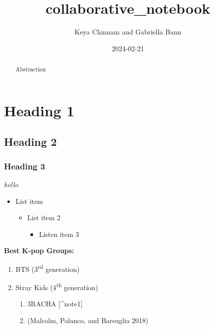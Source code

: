 \documentclass[
  letterpaper,
  DIV=11,
  numbers=noendperiod]{scrartcl}
\title{collaborative\_notebook}
\author{Keya Chinnam and Gabriella Bann}
\date{2024-02-21}
\providecommand{\tightlist}{%
  \setlength{\itemsep}{0pt}\setlength{\parskip}{0pt}}\usepackage{longtable,booktabs,array}
\begin{document}
\maketitle
\begin{abstract}
Abstraction
\end{abstract}


\section{Heading 1}\label{heading-1}

\subsection{Heading 2}\label{heading-2}

\subsubsection{Heading 3}\label{heading-3}

\emph{hello}

\begin{itemize}
\item
  List item

  \begin{itemize}
  \item
    List item 2

    \begin{itemize}
    \tightlist
    \item
      Listen item 3
    \end{itemize}
  \end{itemize}
\end{itemize}

\textbf{Best K-pop Groups:}

\begin{enumerate}
\def\labelenumi{\arabic{enumi}.}
\tightlist
\item
  BTS (3\textsuperscript{rd} generation)
\item
  Stray Kids (4\textsuperscript{th} generation)

  \begin{enumerate}
  \def\labelenumii{\arabic{enumii}.}
  \tightlist
  \item
    3RACHA {[}\^{}note1{]}
  \item
    (Malcolm, Polanco, and Barsuglia 2018)
  \end{enumerate}
\end{enumerate}
\end{document}
